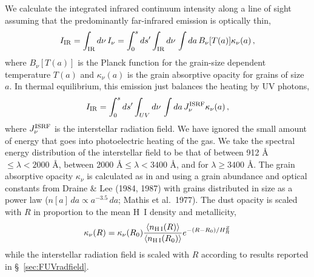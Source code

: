 \documentclass[12pt,preprint,flushrt]{aastex}
\begin{document}
We calculate the integrated infrared continuum intensity along a line of sight
assuming that the predominantly far-infrared emission is optically thin,
\begin{equation}
I_{\rm IR} = \int_{\rm IR}d\nu\, I_\nu =
               \int_0^{s}ds' \int_{\rm IR}d\nu\,\int da\, B_\nu[T(a)]
               \kappa_\nu(a) \, ,
\end{equation}
where $B_\nu[T(a)]$ is the Planck function
for the grain-size dependent temperature $T(a)$
and $\kappa_\nu(a)$ is the grain absorptive
opacity for grains of size $a$.
In thermal equilibrium, this emission just balances the heating by UV
photons,
\begin{equation}
I_{\rm IR}  = \int_0^{s}ds'
\int_{UV} d\nu\,\int da\, J_\nu^{\rm ISRF} \kappa_\nu(a) \, ,
\end{equation}
where $J_\nu^{\rm ISRF}$ is the interstellar radiation field.
We have ignored the small amount of energy that goes into
photoelectric heating of the gas.
We take the spectral energy distribution of the interstellar field to
be that of \cite{dra78}  between 912 \AA $ \le \lambda < 2000$ \AA ,
\cite{dish82} between 2000 \AA $\le \lambda <  3400$ \AA , and
\cite{mat83} for $\lambda \ge 3400$ \AA . The grain absorptive
opacity $\kappa_\nu$ is calculated as in \cite{wol86} and \cite{wol94}
using a grain abundance and optical constants from Draine \& Lee (1984, 1987)
with grains distributed in size as a power law
($n[a]\, da\propto a^{-3.5}\, da$; Mathis et al.\ 1977). The dust opacity is
scaled with $R$ in proportion to the mean H~I density and metallicity,
\begin{equation}
   \kappa_{\nu}(R) = \kappa_{\nu} (R_0)\frac{\langle n_{\rm H\,I}(R)\rangle }
                 {\langle n_{\rm H\,I}(R_0) \rangle }
          {e}^{-(R-R_0)/H_R^Z}
\end{equation}
while the interstellar radiation field is scaled with $R$ according to
results reported in \S~\ref{sec:FUVradfield}.
\end{document}
